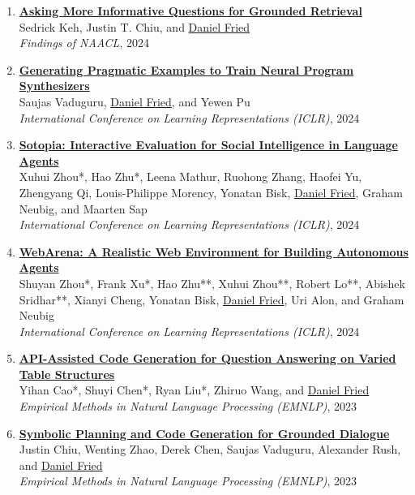 \begin{enumerate}[leftmargin=-1mm,partopsep=0pt]
  \item \href{https://arxiv.org/abs/2311.08584}{\textbf{Asking More Informative Questions for Grounded Retrieval}} \\
    Sedrick Keh, Justin T. Chiu, and \underline{Daniel Fried} \\
    \emph{Findings of NAACL}, 2024

  \item \href{https://arxiv.org/abs/2311.05740}{\textbf{Generating Pragmatic Examples to Train Neural Program Synthesizers}} \\
    Saujas Vaduguru, \underline{Daniel Fried}, and Yewen Pu \\
    \emph{International Conference on Learning Representations (ICLR)}, 2024

  \item \href{http://arxiv.org/abs/2310.11667}{\textbf{Sotopia: Interactive Evaluation for Social Intelligence in Language Agents}} \\
    Xuhui Zhou*, Hao Zhu*, Leena Mathur, Ruohong Zhang, Haofei Yu, Zhengyang Qi, Louis-Philippe Morency, Yonatan Bisk, \underline{Daniel Fried}, Graham Neubig, and Maarten Sap \\
    \emph{International Conference on Learning Representations (ICLR)}, 2024

  \item \href{https://arxiv.org/abs/2307.13854}{\textbf{WebArena: A Realistic Web Environment for Building Autonomous Agents}} \\
    Shuyan Zhou*, Frank Xu*, Hao Zhu**, Xuhui Zhou**, Robert Lo**, Abishek Sridhar**, Xianyi Cheng, Yonatan Bisk, \underline{Daniel Fried}, Uri Alon, and Graham Neubig \\
    \emph{International Conference on Learning Representations (ICLR)}, 2024

  \item \href{https://arxiv.org/abs/2310.14687}{\textbf{API-Assisted Code Generation for Question Answering on Varied Table Structures}} \\
    Yihan Cao*, Shuyi Chen*, Ryan Liu*, Zhiruo Wang, and \underline{Daniel Fried} \\
    \emph{Empirical Methods in Natural Language Processing (EMNLP)}, 2023

  \item \href{https://arxiv.org/abs/2310.17140}{\textbf{Symbolic Planning and Code Generation for Grounded Dialogue }} \\
    Justin Chiu, Wenting Zhao, Derek Chen, Saujas Vaduguru, Alexander Rush, and \underline{Daniel Fried} \\
    \emph{Empirical Methods in Natural Language Processing (EMNLP)}, 2023


\end{enumerate}
